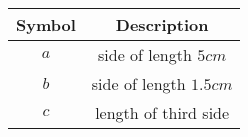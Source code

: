 \begin{tabular}[12pt]{ |c|c|}
    \hline
    \textbf{Symbol} & \textbf{Description} \\
    \hline
    \textbf{$a$} & side of length $5cm$\\
    \hline
    \textbf{$b$} & side of length $1.5cm$\\
    \hline
    \textbf{$c$} & length of third side\\
    \hline
    \end{tabular}
